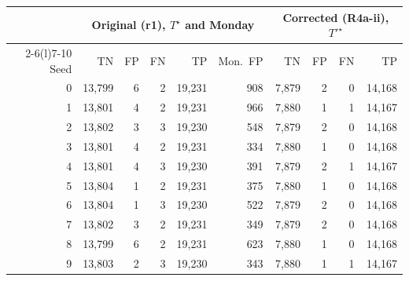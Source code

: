 \begin{tabular}{@{}r rrrr r rrrr@{}}
\toprule
 & \multicolumn{5}{c}{Original (r1), $T^\star$ and Monday} & \multicolumn{4}{c}{Corrected (R4a-ii), $T'^\star$} \\
\cmidrule(lr){2-6}\cmidrule(l){7-10}
Seed & TN & FP & FN & TP & Mon.\ FP & TN & FP & FN & TP \\
\midrule
0 & 13,799 & 6 & 2 & 19,231 & 908 & 7,879 & 2 & 0 & 14,168 \\
1 & 13,801 & 4 & 2 & 19,231 & 966 & 7,880 & 1 & 1 & 14,167 \\
2 & 13,802 & 3 & 3 & 19,230 & 548 & 7,879 & 2 & 0 & 14,168 \\
3 & 13,801 & 4 & 2 & 19,231 & 334 & 7,880 & 1 & 0 & 14,168 \\
4 & 13,801 & 4 & 3 & 19,230 & 391 & 7,879 & 2 & 1 & 14,167 \\
5 & 13,804 & 1 & 2 & 19,231 & 375 & 7,880 & 1 & 0 & 14,168 \\
6 & 13,804 & 1 & 3 & 19,230 & 522 & 7,879 & 2 & 0 & 14,168 \\
7 & 13,802 & 3 & 2 & 19,231 & 349 & 7,879 & 2 & 0 & 14,168 \\
8 & 13,799 & 6 & 2 & 19,231 & 623 & 7,880 & 1 & 0 & 14,168 \\
9 & 13,803 & 2 & 3 & 19,230 & 343 & 7,880 & 1 & 1 & 14,167 \\
\bottomrule
\end{tabular}
